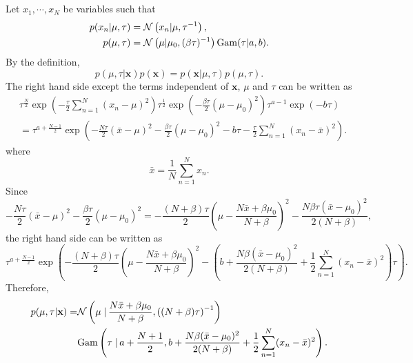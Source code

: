 \subsection{}
\label{2.44}
Let $x_1, \cdots, x_N$ be variables such that
%
\begin{equation}
\begin{aligned}
p (x_n | \mu, \tau)
&=
\mathcal{N}
\left(
	x_n
	|
	\mu,
	\tau ^ {- 1}
\right),
\\
p(\mu, \tau)
&=
\mathcal{N}
\left(
	\mu
	|
	\mu_0,
	(\beta \tau) ^ {- 1}
\right)
{\rm Gam} (\tau | a, b).
\end{aligned}
\end{equation}
%
By the definition,
%
\begin{equation}
p(\mu, \tau | \mathbf{x})
p(\mathbf{x})
=
p(\mathbf{x} | \mu, \tau)
p(\mu, \tau).
\end{equation}
%
The right hand side except the terms independent of $\mathbf{x}$, $\mu$ and $\tau$ can be written as
%
\begin{equation}
\begin{aligned}
&
\tau ^ \frac{N}{2}
\exp 
\left(
	-
	\frac{\tau}{2}
	\sum_{n = 1}^{N} 
	(x_n - \mu) ^ 2
\right)
\tau ^ \frac{1}{2}
\exp 
\left(
	-
	\frac{\beta \tau}{2}
	(\mu - \mu_0) ^ 2
\right)
\tau ^ {a - 1} 
\exp(- b \tau) 
\\
&=
\tau ^ {a + \frac{N - 1}{2}}
\exp
\left(
	-
	\frac{N \tau}{2}
	(\bar{x} - \mu) ^ 2	
	-
	\frac{\beta \tau}{2}
	(\mu - \mu_0) ^ 2
	-
	b \tau
	-
	\frac{\tau}{2}
	\sum_{n = 1}^{N} 
	(x_n - \bar{x}) ^ 2
\right).
\end{aligned}
\end{equation}
%
where
%
\begin{equation}
\bar{x}
=
\frac{1}{N}
\sum_{n = 1}^{N}
x_n.
\end{equation}
%
Since
%
\begin{equation}
-
\frac{N \tau}{2}
(\bar{x} - \mu) ^ 2	
-
\frac{\beta \tau}{2}
(\mu - \mu_0) ^ 2
=
-
\frac{(N + \beta) \tau}{2}
\left(
	\mu 
	-
	\frac{N \bar{x} + \beta \mu_0}{N + \beta}
\right) ^ 2
-
\frac{N \beta \tau (\bar{x} - \mu_0) ^ 2}{2 (N + \beta)},
\end{equation}
%
the right hand side can be written as
%
\begin{equation}
\tau ^ {a + \frac{N - 1}{2}}
\exp
\left(
	-
	\frac{(N + \beta) \tau}{2}
	\left(
		\mu 
		-
		\frac{N \bar{x} + \beta \mu_0}{N + \beta}
	\right) ^ 2
	-
	\left(
		b
		+
		\frac{N \beta (\bar{x} - \mu_0) ^ 2}{2 (N + \beta)}
		+
		\frac{1}{2}
		\sum_{n = 1}^{N} 
		(x_n - \bar{x}) ^ 2
	\right)
	\tau
\right).
\end{equation}
%
Therefore,
%
\begin{equation}
\begin{aligned}
p(\mu, \tau | \mathbf{x})
=&
\mathcal{N} 
\left(
	\mu
	\left.
	\right \vert
	\frac{N \bar{x} + \beta \mu_0}{N + \beta},
	\left(
		(N + \beta) 
		\tau
	\right) ^ {- 1}
\right) 
\\
&
{\rm Gam}
\left(
	\tau
	\left.
	\right \vert
	a + \frac{N + 1}{2},
	b
	+
	\frac{N \beta (\bar{x} - \mu_0) ^ 2}{2 (N + \beta)}
	+
	\frac{1}{2}
	\sum_{n = 1}^{N} (x_n - \bar{x}) ^ 2
\right).
\end{aligned}
\end{equation}
%


